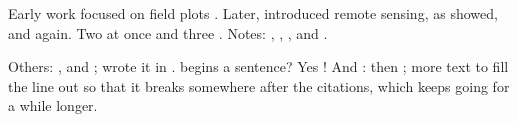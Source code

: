 \documentclass{article}
\begin{document}
Early work focused on field plots \citep{smith1990}. Later,
\citet{jones2005} introduced remote sensing, as \cite{lee2010} showed, and
\cite[p.~4]{lee2010} again. Two at once \citep{smith1990,jones2005} and three
\citet{a, b,c}. Notes: \citep[see][p.~12]{smith1990}, \citep[p.~3]{jones2005},
\citep[e.g.][]{lee2010}, \citet[ch.~2]{lee2010} and \citet*{lee2010}.

Others: \citealt{a}, \citealp{a} and \citealp[p.~1]{a}; \citeauthor{a} wrote
it in \citeyear{a} \citeyearpar{a}.  begins a sentence? Yes \citep{a}!
And \citet{a}: then \citep{a}; more text to fill the line out so that it
breaks somewhere after the citations, which keeps going for a while longer.



\end{document}
